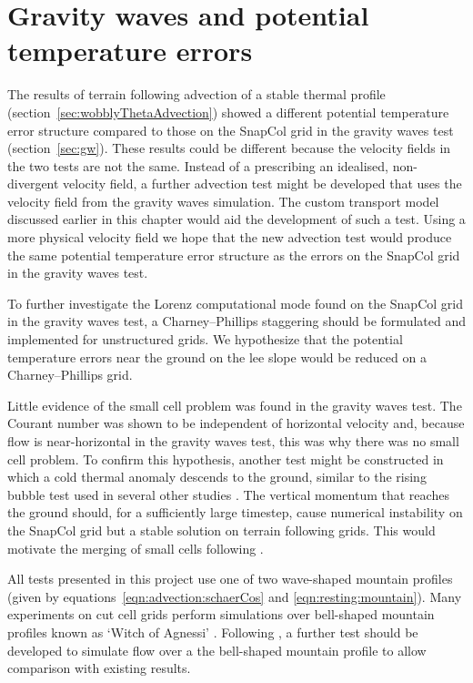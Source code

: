 \section{Gravity waves and potential temperature errors}

The results of terrain following advection of a stable thermal profile (section~\ref{sec:wobblyThetaAdvection}) showed a different potential temperature error structure compared to those on the SnapCol grid in the gravity waves test (section~\ref{sec:gw}).  These results could be different because the velocity fields in the two tests are not the same.  Instead of a prescribing an idealised, non-divergent velocity field, a further advection test might be developed that uses the velocity field from the gravity waves simulation.  The custom transport model discussed earlier in this chapter would aid the development of such a test.  Using a more physical velocity field we hope that the new advection test would produce the same potential temperature error structure as the errors on the SnapCol grid in the gravity waves test.

To further investigate the Lorenz computational mode found on the SnapCol grid in the gravity waves test, a Charney--Phillips staggering should be formulated and implemented for unstructured grids.  We hypothesize that the potential temperature errors near the ground on the lee slope would be reduced on a Charney--Phillips grid.

Little evidence of the small cell problem was found in the gravity waves test.  The Courant number was shown to be independent of horizontal velocity and, because flow is near-horizontal in the gravity waves test, this was why there was no small cell problem.  To confirm this hypothesis, another test might be constructed in which a cold thermal anomaly descends to the ground, similar to the rising bubble test used in several other studies \parencites{bonaventura2000}{jebens2011}{good2013}.  The vertical momentum that reaches the ground should, for a sufficiently large timestep, cause numerical instability on the SnapCol grid but a stable solution on terrain following grids.  This would motivate the merging of small cells following \textcite{yamazaki-satomura2010}.

All tests presented in this project use one of two wave-shaped mountain profiles (given by equations~\ref{eqn:advection:schaerCos} and \ref{eqn:resting:mountain}).  Many experiments on cut cell grids perform simulations over bell-shaped mountain profiles known as `Witch of Agnessi' \parencites{steppeler2002}{rosatti2005}{klein2009}{jebens2011}.  Following \textcite{gallus-klemp2000}, a further test should be developed to simulate flow over a the bell-shaped mountain profile to allow comparison with existing results.

